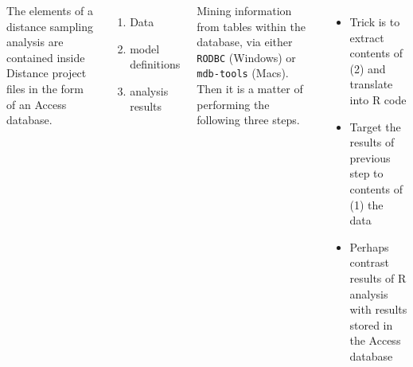 \documentclass[14pt,a1paper,landscape]{tikzposter}
\begin{document}
\begin{columns}
{The elements of a distance sampling analysis are contained inside Distance project files in the form of an Access database.

\begin{enumerate}
	\item Data
	\item model definitions
	\item analysis results
\end{enumerate}

Mining information from tables within the database, via either \texttt{RODBC} (Windows) or \texttt{mdb-tools} (Macs).  Then it is a matter of performing the following three steps.

\begin{itemize}
	\item Trick is to extract contents of (2) and translate into R code
	\item Target the results of previous step to contents of (1) the data
	\item Perhaps contrast results of R analysis with results stored in the Access database
\end{itemize}

}






\end{columns}
\end{document}
